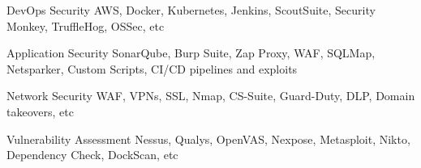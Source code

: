 

\begin{cvskills}

  \cvskill
    {DevOps Security} %
    {AWS, Docker, Kubernetes, Jenkins, ScoutSuite, Security Monkey, TruffleHog, OSSec, etc} %

  \cvskill
    {Application Security} %
    {SonarQube, Burp Suite, Zap Proxy, WAF, SQLMap, Netsparker, Custom Scripts, CI/CD pipelines  and exploits } %

  \cvskill
    {Network Security} %
    {WAF, VPNs, SSL, Nmap, CS-Suite, Guard-Duty, DLP, Domain takeovers, etc } %

  \cvskill
    {Vulnerability Assessment } %
    {Nessus, Qualys, OpenVAS, Nexpose, Metasploit, Nikto, Dependency Check, DockScan, etc } %

\end{cvskills}
